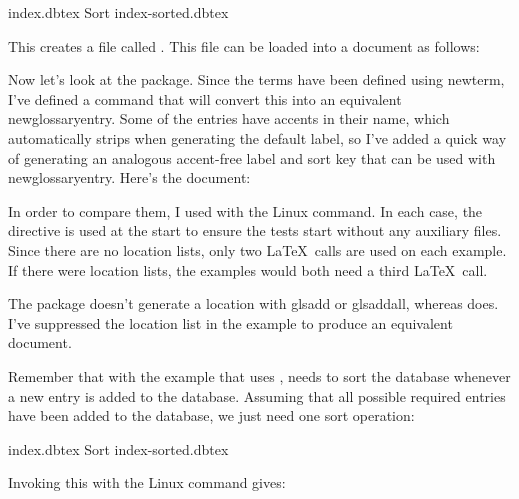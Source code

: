 \begin{terminal}
  index.dbtex  Sort  index-sorted.dbtex
\end{terminal}

   This creates a file called .
   This file can be loaded into a document as follows:



   Now let's look at the  package. Since the terms
   have been defined using \gls{newterm}, I've defined a command
   that will convert this into an equivalent \gls{newglossaryentry}.
   Some of the entries have accents in their name, which
    automatically strips when generating the default 
   label, so I've added a quick way of generating an
   analogous accent-free label and sort key that can be used with \gls{newglossaryentry}. Here's the document:



   In order to compare them, I used  with 
   the Linux  command. In each case, the 
   directive is used at the start to ensure the tests start without
   any auxiliary files. Since there are no location lists, only
   two \LaTeX\ calls are used on each example. If there were
   location lists, the  examples would both
   need a third \LaTeX\ call.

   \begin{information}
   The  package doesn't generate a location with \gls{glsadd}
   or \gls{glsaddall}, whereas  does.
   I've suppressed the location list in the 
   example to produce an equivalent document.
   \end{information}

   Remember that with the example that uses ,
    needs to sort the database whenever a new entry is 
   added to the database. Assuming that all possible required
   entries have been added to the database, we just need one
   sort operation:

\begin{terminal}
  index.dbtex  Sort  index-sorted.dbtex
\end{terminal}
   Invoking this with the Linux  command gives:

